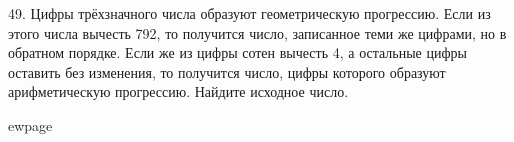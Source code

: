 49. Цифры трёхзначного числа образуют геометрическую прогрессию. Если из этого числа вычесть 792, то получится число, записанное теми же цифрами, но в обратном порядке. Если же из цифры сотен вычесть 4, а остальные цифры оставить без изменения, то получится число, цифры которого образуют арифметическую прогрессию. Найдите исходное число.

ewpage
